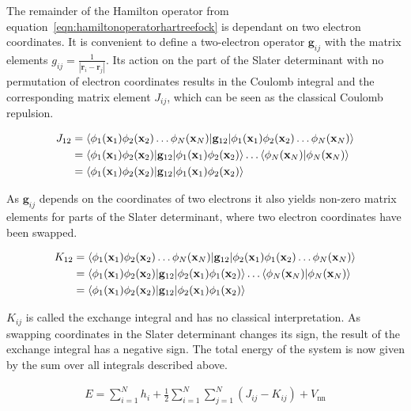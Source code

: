 The remainder of the Hamilton operator from
equation~\eqref{eqn:hamiltonoperatorhartreefock} is dependant on two electron
coordinates. It is convenient to define a two-electron operator $\mathbf{g}_{ij}$
with the matrix elements $g_{ij}=\frac{1}{|\mathbf{r}_i-\mathbf{r}_j|}$. Its
action on the part of the Slater determinant with no permutation of electron
coordinates results in the Coulomb integral and the corresponding matrix
element $J_{ij}$, which can be seen as the classical Coulomb repulsion.

\begin{align}
    \begin{aligned}
        J_{12}&=\braket{\phi_1(\mathbf{x}_1)\phi_2(\mathbf{x}_2)\ldots\phi_N(\mathbf{x}_N)|\mathbf{g}_{12}|\phi_1(\mathbf{x}_1)\phi_2(\mathbf{x}_2)\ldots\phi_N(\mathbf{x}_N)}\\
        &=\braket{\phi_1(\mathbf{x}_1)\phi_2(\mathbf{x}_2)|\mathbf{g}_{12}|\phi_1(\mathbf{x}_1)\phi_2(\mathbf{x}_2)}\ldots\braket{\phi_N(\mathbf{x}_N)|\phi_N(\mathbf{x}_N)} \\
        &=\braket{\phi_1(\mathbf{x}_1)\phi_2(\mathbf{x}_2)|\mathbf{g}_{12}|\phi_1(\mathbf{x}_1)\phi_2(\mathbf{x}_2)}
    \end{aligned}
\end{align}

As $\mathbf{g}_{ij}$ depends on the coordinates of two electrons it also yields
non-zero matrix elements for parts of the Slater determinant, where two
electron coordinates have been swapped.

\begin{align}
    \begin{aligned}
        K_{12}&=\braket{\phi_1(\mathbf{x}_1)\phi_2(\mathbf{x}_2)\ldots\phi_N(\mathbf{x}_N)|\mathbf{g}_{12}|\phi_2(\mathbf{x}_1)\phi_1(\mathbf{x}_2)\ldots\phi_N(\mathbf{x}_N)}\\
        &=\braket{\phi_1(\mathbf{x}_1)\phi_2(\mathbf{x}_2)|\mathbf{g}_{12}|\phi_2(\mathbf{x}_1)\phi_1(\mathbf{x}_2)}\ldots\braket{\phi_N(\mathbf{x}_N)|\phi_N(\mathbf{x}_N)} \\
        &=\braket{\phi_1(\mathbf{x}_1)\phi_2(\mathbf{x}_2)|\mathbf{g}_{12}|\phi_2(\mathbf{x}_1)\phi_1(\mathbf{x}_2)}
    \end{aligned}
\end{align}

$K_{ij}$ is called the exchange integral and has no classical interpretation.
As swapping coordinates in the Slater determinant changes its sign, the result
of the exchange integral has a negative sign. The total energy of the system is
now given by the sum over all integrals described above.

\begin{align}
    E=\sum_{i=1}^Nh_i + \frac{1}{2}\sum_{i=1}^N\sum_{j=1}^N(J_{ij}-K_{ij})+V_\text{nn}
\end{align}
